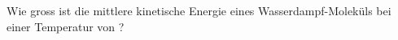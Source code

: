 Wie gross ist die mittlere kinetische Energie eines Wasserdampf-Moleküls bei einer Temperatur von \thWO?
